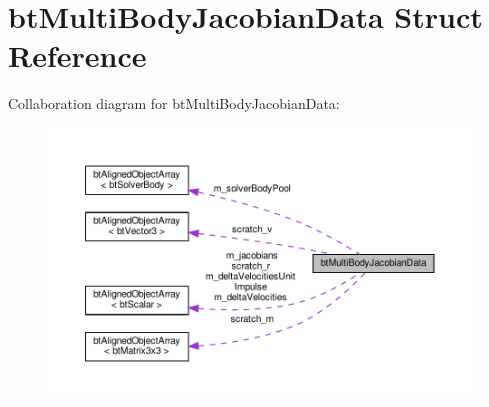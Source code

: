 \hypertarget{structbtMultiBodyJacobianData}{}\section{bt\+Multi\+Body\+Jacobian\+Data Struct Reference}
\label{structbtMultiBodyJacobianData}


Collaboration diagram for bt\+Multi\+Body\+Jacobian\+Data\+:
\nopagebreak
\begin{figure}[H]
\begin{center}
\leavevmode
\includegraphics[width=350pt]{structbtMultiBodyJacobianData__coll__graph}
\end{center}
\end{figure}
